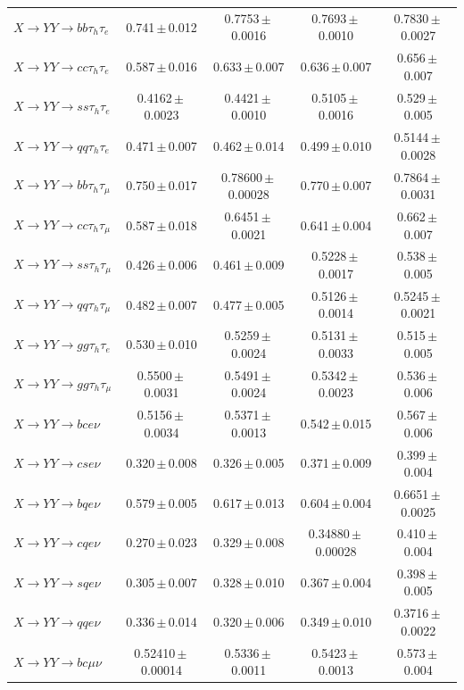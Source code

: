 \begin{landscape}
{\begin{longtable}{@{\extracolsep{\fill}}lcccc@{}}
\midrule
$X\to YY\to bb\tau_h\tau_e$ & 0.741\,$\pm$\,0.012 & 0.7753\,$\pm$\,0.0016 & 0.7693\,$\pm$\,0.0010 & 0.7830\,$\pm$\,0.0027 \\
$X\to YY\to cc\tau_h\tau_e$ & 0.587\,$\pm$\,0.016 & 0.633\,$\pm$\,0.007 & 0.636\,$\pm$\,0.007 & 0.656\,$\pm$\,0.007 \\
$X\to YY\to ss\tau_h\tau_e$ & 0.4162\,$\pm$\,0.0023 & 0.4421\,$\pm$\,0.0010 & 0.5105\,$\pm$\,0.0016 & 0.529\,$\pm$\,0.005 \\
$X\to YY\to qq\tau_h\tau_e$ & 0.471\,$\pm$\,0.007 & 0.462\,$\pm$\,0.014 & 0.499\,$\pm$\,0.010 & 0.5144\,$\pm$\,0.0028 \\
$X\to YY\to bb\tau_h\tau_\mu$ & 0.750\,$\pm$\,0.017 & 0.78600\,$\pm$\,0.00028 & 0.770\,$\pm$\,0.007 & 0.7864\,$\pm$\,0.0031 \\
$X\to YY\to cc\tau_h\tau_\mu$ & 0.587\,$\pm$\,0.018 & 0.6451\,$\pm$\,0.0021 & 0.641\,$\pm$\,0.004 & 0.662\,$\pm$\,0.007 \\
$X\to YY\to ss\tau_h\tau_\mu$ & 0.426\,$\pm$\,0.006 & 0.461\,$\pm$\,0.009 & 0.5228\,$\pm$\,0.0017 & 0.538\,$\pm$\,0.005 \\
$X\to YY\to qq\tau_h\tau_\mu$ & 0.482\,$\pm$\,0.007 & 0.477\,$\pm$\,0.005 & 0.5126\,$\pm$\,0.0014 & 0.5245\,$\pm$\,0.0021 \\
$X\to YY\to gg\tau_h\tau_e$ & 0.530\,$\pm$\,0.010 & 0.5259\,$\pm$\,0.0024 & 0.5131\,$\pm$\,0.0033 & 0.515\,$\pm$\,0.005 \\
$X\to YY\to gg\tau_h\tau_\mu$ & 0.5500\,$\pm$\,0.0031 & 0.5491\,$\pm$\,0.0024 & 0.5342\,$\pm$\,0.0023 & 0.536\,$\pm$\,0.006 \\
\midrule
$X\to YY\to bce\nu$ & 0.5156\,$\pm$\,0.0034 & 0.5371\,$\pm$\,0.0013 & 0.542\,$\pm$\,0.015 & 0.567\,$\pm$\,0.006 \\
$X\to YY\to cse\nu$ & 0.320\,$\pm$\,0.008 & 0.326\,$\pm$\,0.005 & 0.371\,$\pm$\,0.009 & 0.399\,$\pm$\,0.004 \\
$X\to YY\to bqe\nu$ & 0.579\,$\pm$\,0.005 & 0.617\,$\pm$\,0.013 & 0.604\,$\pm$\,0.004 & 0.6651\,$\pm$\,0.0025 \\
$X\to YY\to cqe\nu$ & 0.270\,$\pm$\,0.023 & 0.329\,$\pm$\,0.008 & 0.34880\,$\pm$\,0.00028 & 0.410\,$\pm$\,0.004 \\
$X\to YY\to sqe\nu$ & 0.305\,$\pm$\,0.007 & 0.328\,$\pm$\,0.010 & 0.367\,$\pm$\,0.004 & 0.398\,$\pm$\,0.005 \\
$X\to YY\to qqe\nu$ & 0.336\,$\pm$\,0.014 & 0.320\,$\pm$\,0.006 & 0.349\,$\pm$\,0.010 & 0.3716\,$\pm$\,0.0022 \\
$X\to YY\to bc\mu\nu$ & 0.52410\,$\pm$\,0.00014 & 0.5336\,$\pm$\,0.0011 & 0.5423\,$\pm$\,0.0013 & 0.573\,$\pm$\,0.004 \\

\end{longtable}}
\end{landscape}
